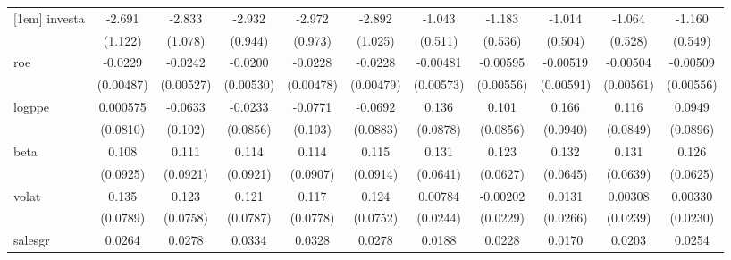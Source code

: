 \begin{table}[htbp]
\begin{tabular}{l*{10}{c}}
[1em]
investa         &   -2.691\sym{**} &   -2.833\sym{**} &   -2.932\sym{***}&   -2.972\sym{***}&   -2.892\sym{***}&   -1.043\sym{**} &   -1.183\sym{**} &   -1.014\sym{**} &   -1.064\sym{**} &   -1.160\sym{**} \\
                &  (1.122)         &  (1.078)         &  (0.944)         &  (0.973)         &  (1.025)         &  (0.511)         &  (0.536)         &  (0.504)         &  (0.528)         &  (0.549)         \\
[1em]
roe             &  -0.0229\sym{***}&  -0.0242\sym{***}&  -0.0200\sym{***}&  -0.0228\sym{***}&  -0.0228\sym{***}& -0.00481         & -0.00595         & -0.00519         & -0.00504         & -0.00509         \\
                &(0.00487)         &(0.00527)         &(0.00530)         &(0.00478)         &(0.00479)         &(0.00573)         &(0.00556)         &(0.00591)         &(0.00561)         &(0.00556)         \\
[1em]
logppe          & 0.000575         &  -0.0633         &  -0.0233         &  -0.0771         &  -0.0692         &    0.136         &    0.101         &    0.166\sym{*}  &    0.116         &   0.0949         \\
                & (0.0810)         &  (0.102)         & (0.0856)         &  (0.103)         & (0.0883)         & (0.0878)         & (0.0856)         & (0.0940)         & (0.0849)         & (0.0896)         \\
[1em]
beta            &    0.108         &    0.111         &    0.114         &    0.114         &    0.115         &    0.131\sym{**} &    0.123\sym{*}  &    0.132\sym{**} &    0.131\sym{**} &    0.126\sym{**} \\
                & (0.0925)         & (0.0921)         & (0.0921)         & (0.0907)         & (0.0914)         & (0.0641)         & (0.0627)         & (0.0645)         & (0.0639)         & (0.0625)         \\
[1em]
volat           &    0.135\sym{*}  &    0.123         &    0.121         &    0.117         &    0.124         &  0.00784         & -0.00202         &   0.0131         &  0.00308         &  0.00330         \\
                & (0.0789)         & (0.0758)         & (0.0787)         & (0.0778)         & (0.0752)         & (0.0244)         & (0.0229)         & (0.0266)         & (0.0239)         & (0.0230)         \\
[1em]
salesgr         &   0.0264         &   0.0278         &   0.0334         &   0.0328         &   0.0278         &   0.0188         &   0.0228         &   0.0170         &   0.0203         &   0.0254         \\

\end{tabular}
\end{table}
